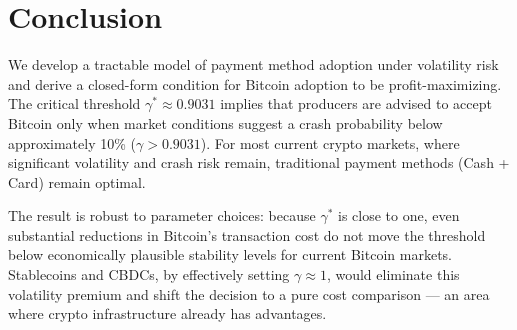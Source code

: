 \documentclass{article}
\begin{document}
\section{Conclusion}
\label{sec:conclusion}

We develop a tractable model of payment method adoption under volatility risk
and derive a closed-form condition for Bitcoin adoption to be profit-maximizing.
The critical threshold $\gamma^* \approx 0.9031$ implies that producers are
advised to accept Bitcoin only when market conditions suggest a crash
probability below approximately 10\% ($\gamma > 0.9031$).
For most current crypto markets, where significant volatility and crash risk
remain, traditional payment methods (Cash + Card) remain optimal.

The result is robust to parameter choices: because $\gamma^*$ is close to one,
even substantial reductions in Bitcoin's transaction cost do not move the
threshold below economically plausible stability levels for current Bitcoin
markets.
Stablecoins and CBDCs, by effectively setting $\gamma \approx 1$, would
eliminate this volatility premium and shift the decision to a pure cost
comparison --- an area where crypto infrastructure already has advantages.
\end{document}
